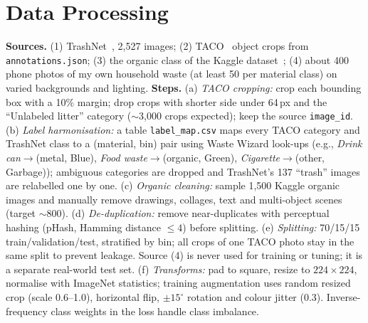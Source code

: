 \documentclass[final]{article}
\begin{document}
\section*{Data Processing}
\textbf{Sources.} (1) TrashNet~\cite{thung2016}, 2,527 images; (2) TACO~\cite{proenca2020} object crops from \texttt{annotations.json}; (3) the organic class of the Kaggle dataset~\cite{sekar2019}; (4) about 400 phone photos of my own household waste (at least 50 per material class) on varied backgrounds and lighting.
\textbf{Steps.} (a) \emph{TACO cropping:} crop each bounding box with a 10\% margin; drop crops with shorter side under 64\,px and the ``Unlabeled litter'' category ($\sim$3,000 crops expected); keep the source \texttt{image\_id}. (b) \emph{Label harmonisation:} a table \texttt{label\_map.csv} maps every TACO category and TrashNet class to a (material, bin) pair using Waste Wizard look-ups (e.g., \emph{Drink can}$\to$(metal, Blue), \emph{Food waste}$\to$(organic, Green), \emph{Cigarette}$\to$(other, Garbage)); ambiguous categories are dropped and TrashNet's 137 ``trash'' images are relabelled one by one. (c) \emph{Organic cleaning:} sample 1,500 Kaggle organic images and manually remove drawings, collages, text and multi-object scenes (target $\sim$800). (d) \emph{De-duplication:} remove near-duplicates with perceptual hashing (pHash, Hamming distance $\le 4$) before splitting. (e) \emph{Splitting:} 70/15/15 train/validation/test, stratified by bin; all crops of one TACO photo stay in the same split to prevent leakage. Source (4) is never used for training or tuning; it is a separate real-world test set. (f) \emph{Transforms:} pad to square, resize to $224\times224$, normalise with ImageNet statistics; training augmentation uses random resized crop (scale 0.6--1.0), horizontal flip, $\pm15^\circ$ rotation and colour jitter (0.3). Inverse-frequency class weights in the loss handle class imbalance.
\end{document}
